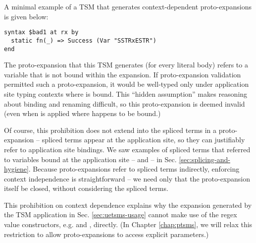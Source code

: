 A minimal example of a TSM that generates context-dependent proto-expansions is given below:
\begin{lstlisting}[numbers=none]
syntax $bad1 at rx by
  static fn(_) => Success (Var "SSTRxESTR")
end
\end{lstlisting}
The proto-expansion that this TSM generates (for every literal body) refers to a variable  that is not bound within the expansion. If proto-expansion validation permitted such a proto-expansion, it would be well-typed only under application site typing contexts where  is bound. This ``hidden assumption'' makes reasoning about binding and renaming difficult, so this proto-expansion is deemed invalid (even when  is applied where  happens to be bound.)

Of course, this prohibition does not extend into the spliced terms in a proto-expansion -- spliced terms appear at the application site, so they can justifiably refer to application site bindings. We saw examples of spliced terms that referred to variables bound at the application site  --  and  -- in Sec. \ref{sec:splicing-and-hygiene}. Because proto-expansions refer to spliced terms indirectly, enforcing context independence is straightforward -- we need only that the proto-expansion itself be closed, without considering the spliced terms.%

This prohibition on context dependence explains why the expansion generated by the TSM application in Sec. \ref{sec:uetsms-usage} cannot make use of the regex value constructors, e.g.  and , directly. (In Chapter \ref{chap:ptsms}, we will relax this restriction to allow proto-expansions to access explicit parameters.)


